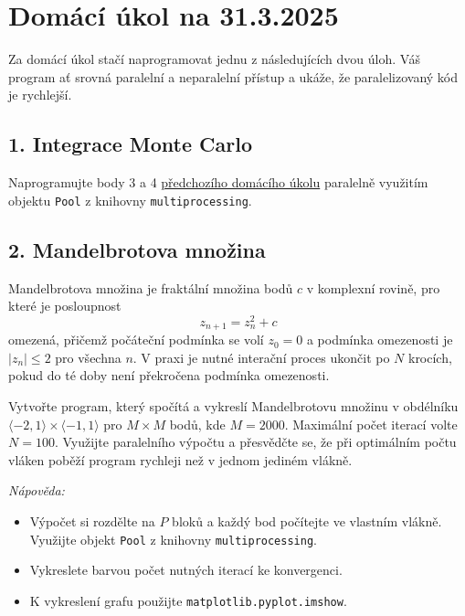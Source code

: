 \documentclass[a4paper,11pt,twoside]{article}
\def\abs#1{\left|#1\right|}
\def\code#1{\textnormal{\texttt{#1}}}
\begin{document}
\section*{Domácí úkol na 31.3.2025}
Za domácí úkol stačí naprogramovat jednu z následujících dvou úloh.
Váš program ať srovná paralelní a neparalelní přístup a ukáže, že paralelizovaný kód je rychlejší.

\subsection*{1. Integrace Monte Carlo}
Naprogramujte body 3 a 4 \href{https://raw.githubusercontent.com/PavelStransky/PCInPhysics/main/ukoly/2025/Ukol3.pdf}{předchozího domácího úkolu} paralelně využitím objektu \code{Pool} z knihovny \code{multiprocessing}.

\subsection*{2. Mandelbrotova množina}
Mandelbrotova množina je fraktální množina bodů $c$ v komplexní rovině, pro které je posloupnost
\begin{equation}
    z_{n+1}=z_{n}^{2}+c
\end{equation}
omezená, přičemž počáteční podmínka se volí $z_0=0$ a podmínka omezenosti je $\abs{z_{n}}\leq2$ pro všechna $n$. 
V praxi je nutné interační proces ukončit po $N$ krocích, pokud do té doby není překročena podmínka omezenosti.

Vytvořte program, který spočítá a vykreslí Mandelbrotovu množinu v obdélníku $\langle-2,1\rangle\times\langle-1,1\rangle$ pro $M\times M$ bodů, kde $M=2000$.
Maximální počet iterací volte $N=100$.
Využijte paralelního výpočtu a přesvědčte se, že při optimálním počtu vláken poběží program rychleji než v jednom jediném vlákně.

\emph{Nápověda:}
\begin{itemize}
    \item Výpočet si rozdělte na $P$ bloků a každý bod počítejte ve vlastním vlákně. Využijte objekt \code{Pool} z knihovny \code{multiprocessing}.
    \item Vykreslete barvou počet nutných iterací ke konvergenci.
    \item K vykreslení grafu použijte \code{matplotlib.pyplot.imshow}.
\end{itemize}
\end{document}
